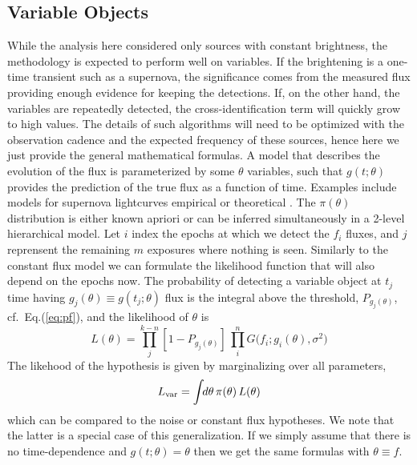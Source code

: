 \iffalse
\begin{figure}
\epsscale{1.2}
\plotone{fig/f9.png}
\caption{The Bayes factor increases for the simulate noise peaks as we increase their surface density. These simulations illustrate that effect for 1$\times$, 2$\times$, ..., and 5$\times$ the original density used in Figure~\ref{fig:bf2}. The highest density of about 3/$\square\arcsec$ corresponds roughly to 1 peak in 9 pixels for images with 0.5\arcsec pixels, which can be considered the absolute limit.}
\label{fig:bfx}
\end{figure}
\fi



\subsection{Variable Objects}
\label{sec:var}
\noindent
While the analysis here considered only sources with constant brightness, the methodology is expected to perform well on variables. If the brightening is a one-time transient such as a supernova, the significance comes from the measured flux providing enough evidence for keeping the detections.
%
If, on the other hand, the variables are repeatedly detected, the cross-identification term will quickly grow to high values. The details of such algorithms will need to be optimized with the observation cadence and the expected frequency of these sources, hence here we just provide the general mathematical formulas.
%
A model that describes the evolution of the flux is parameterized by some $\theta$ variables, such that $g(t;\theta)$ provides the prediction of the true flux as a function of time. Examples include models for supernova lightcurves empirical or theoretical \citep{riess95,snana}. The $\pi(\theta)$ distribution is either known apriori or can be inferred simultaneously in a 2-level hierarchical model.
%
Let $i$ index the epochs at which we detect the $f_i$ fluxes, and $j$ reprensent the remaining $m$ exposures where nothing is seen.
%
Similarly to the constant flux model we can formulate the likelihood function that will also depend on the epochs now. The probability of detecting a variable object at $t_j$ time having
\mbox{$g_j(\theta)\equiv{}g(t_j;\theta)$} flux is the integral above the threshold, $P_{g_j(\theta)}$, cf.\ Eq.(\ref{eq:pf}), and the likelihood of  $\theta$ is
%
\begin{equation}
L(\theta) = \prod_j^{k-n} \left[1\!-\!P_{g_j(\theta)}\right]\,\prod_i^n G\big(f_i;g_i(\theta),\sigma^2\big)
\end{equation}
%
The likehood of the hypothesis is given by marginalizing over all parameters,
%
\begin{equation}
L_{\rm{}var} = \int{}\!\!d\theta\,\pi(\theta)\,L(\theta)
\end{equation}
%
which can be compared to the noise or constant flux hypotheses.
%
We note that the latter is a special case of this generalization.
If we simply assume that there is no time-dependence and \mbox{$g(t;\theta)\!=\!\theta$} then we get the same formulas with \mbox{$\theta\!\equiv{}\!f$}.

